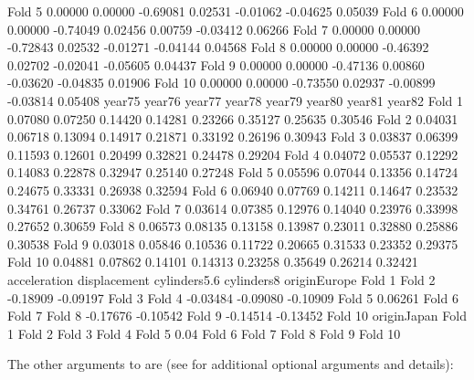 \documentclass[
]{jss}
\begin{document}
\begin{CodeChunk}
\begin{CodeOutput}
Fold 5     0.00000  0.00000 -0.69081  0.02531 -0.01062 -0.04625  0.05039
Fold 6     0.00000  0.00000 -0.74049  0.02456  0.00759 -0.03412  0.06266
Fold 7     0.00000  0.00000 -0.72843  0.02532 -0.01271 -0.04144  0.04568
Fold 8     0.00000  0.00000 -0.46392  0.02702 -0.02041 -0.05605  0.04437
Fold 9     0.00000  0.00000 -0.47136  0.00860 -0.03620 -0.04835  0.01906
Fold 10    0.00000  0.00000 -0.73550  0.02937 -0.00899 -0.03814  0.05408
          year75   year76   year77   year78   year79   year80   year81   year82
Fold 1   0.07080  0.07250  0.14420  0.14281  0.23266  0.35127  0.25635  0.30546
Fold 2   0.04031  0.06718  0.13094  0.14917  0.21871  0.33192  0.26196  0.30943
Fold 3   0.03837  0.06399  0.11593  0.12601  0.20499  0.32821  0.24478  0.29204
Fold 4   0.04072  0.05537  0.12292  0.14083  0.22878  0.32947  0.25140  0.27248
Fold 5   0.05596  0.07044  0.13356  0.14724  0.24675  0.33331  0.26938  0.32594
Fold 6   0.06940  0.07769  0.14211  0.14647  0.23532  0.34761  0.26737  0.33062
Fold 7   0.03614  0.07385  0.12976  0.14040  0.23976  0.33998  0.27652  0.30659
Fold 8   0.06573  0.08135  0.13158  0.13987  0.23011  0.32880  0.25886  0.30538
Fold 9   0.03018  0.05846  0.10536  0.11722  0.20665  0.31533  0.23352  0.29375
Fold 10  0.04881  0.07862  0.14101  0.14313  0.23258  0.35649  0.26214  0.32421
        acceleration displacement cylinders5.6 cylinders8 originEurope
Fold 1                                                                
Fold 2      -0.18909     -0.09197                                     
Fold 3                                                                
Fold 4      -0.03484                  -0.09080   -0.10909             
Fold 5                                                         0.06261
Fold 6                                                                
Fold 7                                                                
Fold 8      -0.17676     -0.10542                                     
Fold 9      -0.14514     -0.13452                                     
Fold 10                                                               
        originJapan
Fold 1             
Fold 2             
Fold 3             
Fold 4             
Fold 5         0.04
Fold 6             
Fold 7             
Fold 8             
Fold 9             
Fold 10            
\end{CodeOutput}
\end{CodeChunk}

The other arguments to  are (see  for
additional optional arguments and details):
\end{document}
